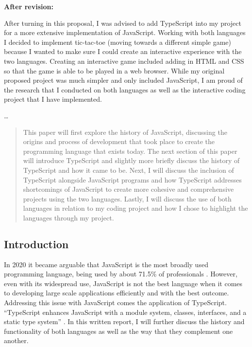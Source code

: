 \documentclass{article}
\theoremstyle{theorem}
\theoremstyle{definition}
\theoremstyle{remark}
\begin{document}
\textbf{After revision:}

After turning in this proposal, I was advised to add TypeScript into my project for a more extensive implementation of JavaScript. Working with both languages I decided to implement tic-tac-toe (moving towards a different simple game) because I wanted to make sure I could create an interactive experience with the two languages. Creating an interactive game included adding in HTML and CSS so that the game is able to be played in a web browser. While my original proposed project was much simpler and only included JavaScript, I am proud of the research that I conducted on both languages as well as the interactive coding project that I have implemented.

\ldots
\maketitle

\begin{abstract}
This paper will first explore the history of JavaScript, discussing the origins and process of development that took place to create the programming language that exists today. The next section of this paper will introduce TypeScript and slightly more briefly discuss the history of TypeScript and how it came to be. Next, I will discuss the inclusion of TypeScript alongside JavaScript programs and how TypeScript addresses shortcomings of JavaScript to create more cohesive and comprehensive projects using the two languages. Lastly, I will discuss the use of both languages in relation to my coding project and how I chose to highlight the languages through my project.

\end{abstract}

\subsection{Introduction}
In 2020 it became arguable that JavaScript is the most broadly used programming language, being used by about 71.5\% of professionals \cite{1}. However, even with its widespread use, JavaScript is not the best language when it comes to developing large scale applications efficiently and with the best outcome. Addressing this issue with JavaScript comes the application of TypeScript. “TypeScript enhances JavaScript with a module system, classes, interfaces, and a static type system”  \cite{3}. In this written report, I will further discuss the history and functionality of both languages as well as the way that they complement one another.
\end{document}
